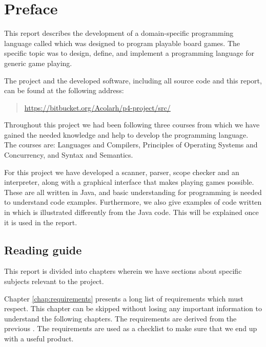 \chapter*{Preface}
\label{chap:preface}

This report describes the development of a domain-specific programming
language called \productname{} which was designed to program playable board games. The 
specific topic was to design, define, and implement a programming language for 
generic game playing. 

The project and the developed software, including all source code and
this report, can be found at the following address:

\begin{quote}
  \url{https://bitbucket.org/Acolarh/p4-project/src/}  
\end{quote}

Throughout this project we had been following three courses from which we have
gained the needed knowledge and help to develop the programming language. The
courses are: Languages and Compilers, Principles of Operating Systems and
Concurrency, and Syntax and Semantics.

For this project we have developed a scanner, parser, scope checker and
an interpreter, along with a graphical interface that makes playing
games possible. These are all written in Java, and basic understanding
for programming is needed to understand code examples. Furthermore,
we also give examples of code written in \productname{} which is
illustrated differently from the Java code. This will be explained once
it is used in the report.


\section*{Reading guide}

This report is divided into chapters wherein we have sections about specific
subjects relevant to the project.

Chapter \ref{chap:requirements} presents a long list of requirements which
\productname{} must respect. This chapter can be skipped without losing any
important information to understand the following chapters. The requirements are 
derived from the previous . The requirements are used as
a checklist to make sure that we end up with a useful product.

